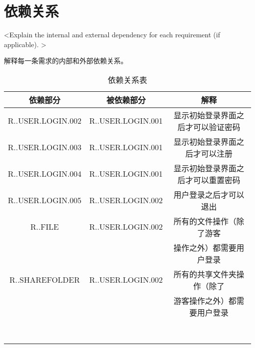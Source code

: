 \chapter{依赖关系}
<Explain the internal and external dependency for each requirement (if applicable). >

解释每一条需求的内部和外部依赖关系。

\begin{table}[htbp]
\centering
\caption{依赖关系表} \label{tab:simpletable}
\begin{tabular}{|c|c|c|}
    \hline
    依赖部分 & 被依赖部分 & 解释  \\
    \hline
    R..USER.LOGIN.002 & R..USER.LOGIN.001 & 显示初始登录界面之后才可以验证密码 \\
    \hline
    R..USER.LOGIN.003 & R..USER.LOGIN.001 & 显示初始登录界面之后才可以注册 \\
    \hline
    R..USER.LOGIN.004 & R..USER.LOGIN.001 & 显示初始登录界面之后才可以重置密码 \\
    \hline
    R..USER.LOGIN.005 & R..USER.LOGIN.002 & 用户登录之后才可以退出 \\
    \hline
    R..FILE & R..USER.LOGIN.002 & 所有的文件操作（除了游客\\ &  &操作之外）都需要用户登录 \\ 
    \hline
    R..SHAREFOLDER & R..USER.LOGIN.002 & 所有的共享文件夹操作（除了\\ &  &游客操作之外）都需要用户登录\\
    \hline
     &  & \\
    \hline
     &  & \\
    \hline
     &  & \\
    \hline
     &  & \\
    \hline
     &  & \\
    \hline
     &  & \\
    \hline
     &  & \\
    \hline
     &  & \\
    
\end{tabular}
\end{table} 
